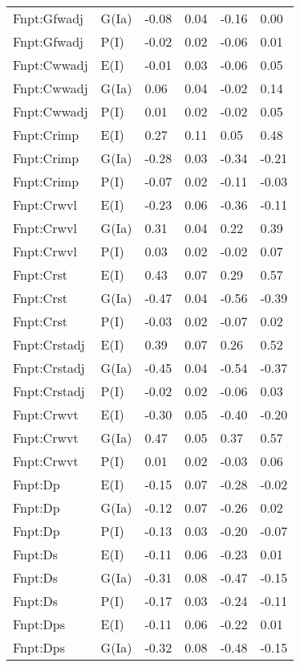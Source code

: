 \begin{center}
\begin{longtable}{|p{1.1in}|p{0.7in}|p{0.7in}|p{0.6in}|p{0.6in}|p{0.6in}|}
  Fnpt:Gfwadj & G(Ia) & -0.08 & 0.04 & -0.16 & 0.00 \\ 
  Fnpt:Gfwadj & P(I) & -0.02 & 0.02 & -0.06 & 0.01 \\ 
  Fnpt:Cwwadj & E(I) & -0.01 & 0.03 & -0.06 & 0.05 \\ 
  Fnpt:Cwwadj & G(Ia) & 0.06 & 0.04 & -0.02 & 0.14 \\ 
  Fnpt:Cwwadj & P(I) & 0.01 & 0.02 & -0.02 & 0.05 \\ 
  Fnpt:Crimp & E(I) & 0.27 & 0.11 & 0.05 & 0.48 \\ 
  Fnpt:Crimp & G(Ia) & -0.28 & 0.03 & -0.34 & -0.21 \\ 
  Fnpt:Crimp & P(I) & -0.07 & 0.02 & -0.11 & -0.03 \\ 
  Fnpt:Crwvl & E(I) & -0.23 & 0.06 & -0.36 & -0.11 \\ 
  Fnpt:Crwvl & G(Ia) & 0.31 & 0.04 & 0.22 & 0.39 \\ 
  Fnpt:Crwvl & P(I) & 0.03 & 0.02 & -0.02 & 0.07 \\ 
  Fnpt:Crst & E(I) & 0.43 & 0.07 & 0.29 & 0.57 \\ 
  Fnpt:Crst & G(Ia) & -0.47 & 0.04 & -0.56 & -0.39 \\ 
  Fnpt:Crst & P(I) & -0.03 & 0.02 & -0.07 & 0.02 \\ 
  Fnpt:Crstadj & E(I) & 0.39 & 0.07 & 0.26 & 0.52 \\ 
  Fnpt:Crstadj & G(Ia) & -0.45 & 0.04 & -0.54 & -0.37 \\ 
  Fnpt:Crstadj & P(I) & -0.02 & 0.02 & -0.06 & 0.03 \\ 
  Fnpt:Crwvt & E(I) & -0.30 & 0.05 & -0.40 & -0.20 \\ 
  Fnpt:Crwvt & G(Ia) & 0.47 & 0.05 & 0.37 & 0.57 \\ 
  Fnpt:Crwvt & P(I) & 0.01 & 0.02 & -0.03 & 0.06 \\ 
  Fnpt:Dp & E(I) & -0.15 & 0.07 & -0.28 & -0.02 \\ 
  Fnpt:Dp & G(Ia) & -0.12 & 0.07 & -0.26 & 0.02 \\ 
  Fnpt:Dp & P(I) & -0.13 & 0.03 & -0.20 & -0.07 \\ 
  Fnpt:Ds & E(I) & -0.11 & 0.06 & -0.23 & 0.01 \\ 
  Fnpt:Ds & G(Ia) & -0.31 & 0.08 & -0.47 & -0.15 \\ 
  Fnpt:Ds & P(I) & -0.17 & 0.03 & -0.24 & -0.11 \\ 
  Fnpt:Dps & E(I) & -0.11 & 0.06 & -0.22 & 0.01 \\ 
  Fnpt:Dps & G(Ia) & -0.32 & 0.08 & -0.48 & -0.15 \\ 

\end{longtable}
\end{center}
